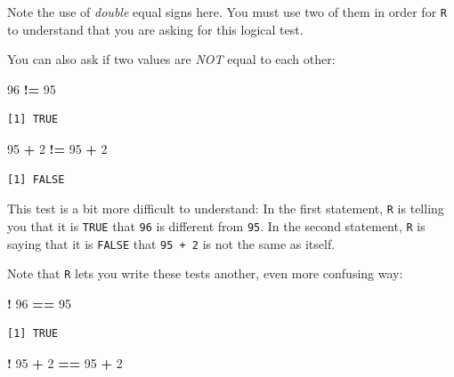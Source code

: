 \documentclass[
]{book}
\newenvironment{Shaded}{\begin{snugshade}}{\end{snugshade}}
\newcommand{\DecValTok}[1]{\textcolor[rgb]{0.00,0.00,0.81}{#1}}
\newcommand{\OperatorTok}[1]{\textcolor[rgb]{0.81,0.36,0.00}{\textbf{#1}}}
\newcommand{\StringTok}[1]{\textcolor[rgb]{0.31,0.60,0.02}{#1}}
\begin{document}
Note the use of \emph{double} equal signs here. You must use two of them in order for \texttt{R} to understand that you are asking for this logical test.

You can also ask if two values are \emph{NOT} equal to each other:

\begin{Shaded}
\begin{Highlighting}[]
\DecValTok{96} \OperatorTok{!=}\StringTok{ }\DecValTok{95}
\end{Highlighting}
\end{Shaded}

\begin{verbatim}
[1] TRUE
\end{verbatim}

\begin{Shaded}
\begin{Highlighting}[]
\DecValTok{95} \OperatorTok{+}\StringTok{ }\DecValTok{2} \OperatorTok{!=}\StringTok{ }\DecValTok{95} \OperatorTok{+}\StringTok{ }\DecValTok{2}
\end{Highlighting}
\end{Shaded}

\begin{verbatim}
[1] FALSE
\end{verbatim}

This test is a bit more difficult to understand: In the first statement, \texttt{R} is telling you that it is \texttt{TRUE} that \texttt{96} is different from \texttt{95}. In the second statement, \texttt{R} is saying that it is \texttt{FALSE} that \texttt{95\ +\ 2} is not the same as itself.

Note that \texttt{R} lets you write these tests another, even more confusing way:

\begin{Shaded}
\begin{Highlighting}[]
\OperatorTok{!}\StringTok{ }\DecValTok{96} \OperatorTok{==}\StringTok{ }\DecValTok{95}
\end{Highlighting}
\end{Shaded}

\begin{verbatim}
[1] TRUE
\end{verbatim}

\begin{Shaded}
\begin{Highlighting}[]
\OperatorTok{!}\StringTok{ }\DecValTok{95} \OperatorTok{+}\StringTok{ }\DecValTok{2} \OperatorTok{==}\StringTok{ }\DecValTok{95} \OperatorTok{+}\StringTok{ }\DecValTok{2}
\end{Highlighting}
\end{Shaded}
\end{document}
